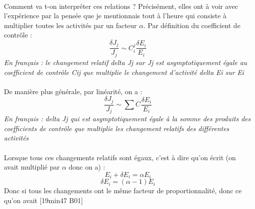 \paragraph{}Comment va t-on interpréter ces relations ? Précisément, elles ont à voir avec l'expérience par la pensée que je mentionnais tout à l'heure qui consiste à multiplier toutes les activités par un facteur $\alpha$. Par définition du coefficient de contrôle :
$$\frac{\delta J_{j}}{J_{j}} \sim C_{i}^{j}\frac{\delta E_{i}}{E_{i}}$$
\textit{En français : le changement relatif delta Jj sur Jj est asymptotiquement égale au coefficient de contrôle Cij que multiplie le changement d'activité delta Ei sur Ei}

\paragraph{}De manière plus générale, par linéarité, on a :
$$\frac{\delta J_{j}}{J_{j}} \sim \sum{C_{}^{}\frac{\delta E_{i}}{E_{i}}}$$
\textit{En français : delta Jj qui est asymptotiquement égale à la somme des produits des coefficients de contrôle que multiplie les changement relatifs des différentes activités}

\paragraph{}Lorsque tous ces changements relatifs sont égaux, c'est à dire qu'on écrit (on avait multiplié par $\alpha$ donc on a) :
$$E_{i} + \delta E_{i} = \alpha E_{i}$$
$$\delta E_{i} = (\alpha - 1) E_{i}$$
Donc si tous les changements ont le même facteur de proportionnalité, donc ce qu'on avait [19min47 B01]
